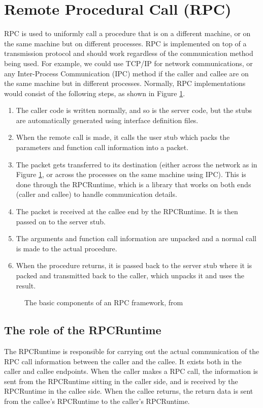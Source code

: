 \section{Remote Procedural Call (RPC)}
\label{RPCBackgroundSection} 
RPC is used to uniformly call a procedure that is on a different machine, or on the same machine but on different processes. RPC is implemented on top of a transmission protocol and should work regardless of the communication method being used. For example, we could use TCP/IP for network communications, or any Inter-Process Communication (IPC) method if the caller and callee are on the same machine but in different processes. Normally, RPC implementations would consist of the following steps, as shown in Figure \ref{fig:rpc-components}.

\begin{enumerate}
  \item The caller code is written normally, and so is the server code, but the stubs are automatically generated using interface definition files.
  \item When the remote call is made, it calls the user stub which packs the parameters and function call information into a packet.
  \item The packet gets transferred to its destination (either across the network as in Figure \ref{fig:rpc-components}, or across the processes on the same machine using IPC). This is done through the RPCRuntime, which is a library that works on both ends (caller and callee) to handle communication details.
  \item The packet is received at the callee end by the RPCRuntime. It is then passed on to the server stub.
  \item The arguments and function call information are unpacked and a normal call is made to the actual procedure.
  \item When the procedure returns, it is passed back to the server stub where it is packed and transmitted back to the caller, which unpacks it and uses the result.
\end{enumerate}

\begin{figure}
    \centering
    \caption{The basic components of an RPC framework, from \cite{birrell1984implementing}}
    \label{fig:rpc-components}
\end{figure}

\subsection{The role of the RPCRuntime}
\label{RPCRuntimeBackgroundSection} 
The RPCRuntime is responsible for carrying out the actual communication of the RPC call information between the caller and the callee. It exists both in the caller and callee endpoints. When the caller makes a RPC call, the information is sent from the RPCRuntime sitting in the caller side, and is received by the RPCRuntime in the callee side. When the callee returns, the return data is sent from the callee's RPCRuntime to the caller's RPCRuntime.

